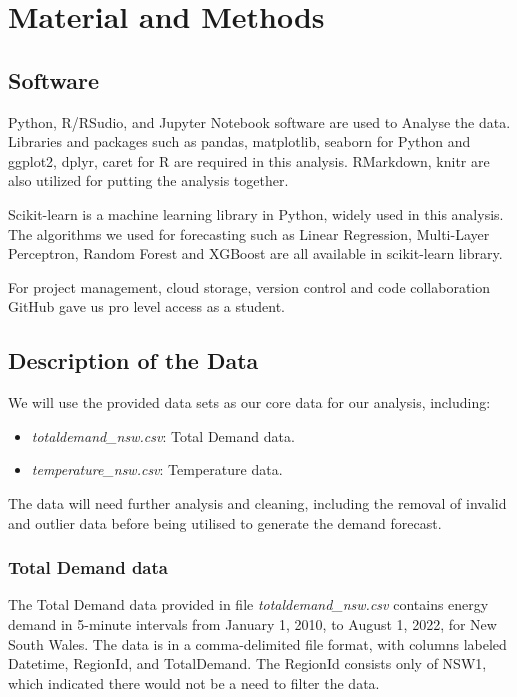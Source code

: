 \documentclass[mstat,12pt]{unswthesis}
\begin{document}
\hypertarget{s-material-methods}{%
\chapter{Material and Methods}\label{s-material-methods}}

\hypertarget{software}{%
\section{Software}\label{software}}

Python, R/RSudio, and Jupyter Notebook software are used to Analyse the
data. Libraries and packages such as pandas, matplotlib, seaborn for
Python and ggplot2, dplyr, caret for R are required in this analysis.
RMarkdown, knitr are also utilized for putting the analysis together.

Scikit-learn is a machine learning library in Python, widely used in
this analysis. The algorithms we used for forecasting such as Linear
Regression, Multi-Layer Perceptron, Random Forest and XGBoost are all
available in scikit-learn library.

For project management, cloud storage, version control and code
collaboration GitHub gave us pro level access as a student.

\hypertarget{description-of-the-data}{%
\section{Description of the Data}\label{description-of-the-data}}

We will use the provided data sets as our core data for our analysis,
including:

\begin{itemize}
\item
  \emph{totaldemand\_nsw.csv}: Total Demand data.
\item
  \emph{temperature\_nsw.csv}: Temperature data.
\end{itemize}

The data will need further analysis and cleaning, including the removal
of invalid and outlier data before being utilised to generate the demand
forecast.

\hypertarget{total-demand-data}{%
\subsection{Total Demand data}\label{total-demand-data}}

The Total Demand data provided in file \emph{totaldemand\_nsw.csv}
contains energy demand in 5-minute intervals from January 1, 2010, to
August 1, 2022, for New South Wales. The data is in a comma-delimited
file format, with columns labeled Datetime, RegionId, and TotalDemand.
The RegionId consists only of NSW1, which indicated there would not be a
need to filter the data.
\end{document}
